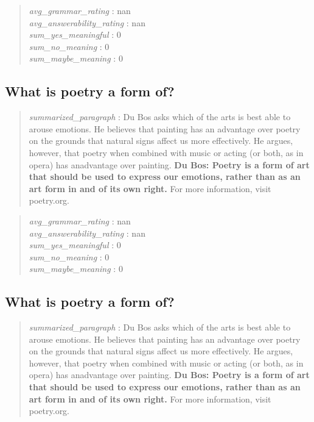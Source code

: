 \begin{quote}
\emph{avg\_grammar\_rating} : nan\\
\emph{avg\_answerability\_rating} : nan\\
\emph{sum\_yes\_meaningful} : 0\\
\emph{sum\_no\_meaning} : 0\\
\emph{sum\_maybe\_meaning} : 0
\end{quote}

\hypertarget{what-is-poetry-a-form-of}{%
\subsection{What is poetry a form of?}\label{what-is-poetry-a-form-of}}

\begin{quote}
\emph{summarized\_paragraph} : Du Bos asks which of the arts is best
able to arouse emotions. He believes that painting has an advantage over
poetry on the grounds that natural signs affect us more effectively. He
argues, however, that poetry when combined with music or acting (or
both, as in opera) has anadvantage over painting. \textbf{Du Bos: Poetry
is a form of art that should be used to express our emotions, rather
than as an art form in and of its own right.} For more information,
visit poetry.org.
\end{quote}

\begin{quote}
\emph{avg\_grammar\_rating} : nan\\
\emph{avg\_answerability\_rating} : nan\\
\emph{sum\_yes\_meaningful} : 0\\
\emph{sum\_no\_meaning} : 0\\
\emph{sum\_maybe\_meaning} : 0
\end{quote}

\hypertarget{what-is-poetry-a-form-of-1}{%
\subsection{What is poetry a form
of?}\label{what-is-poetry-a-form-of-1}}

\begin{quote}
\emph{summarized\_paragraph} : Du Bos asks which of the arts is best
able to arouse emotions. He believes that painting has an advantage over
poetry on the grounds that natural signs affect us more effectively. He
argues, however, that poetry when combined with music or acting (or
both, as in opera) has anadvantage over painting. \textbf{Du Bos: Poetry
is a form of art that should be used to express our emotions, rather
than as an art form in and of its own right.} For more information,
visit poetry.org.
\end{quote}

